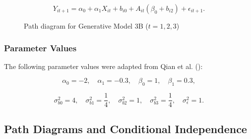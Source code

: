 \documentclass[
  12pt,
  a4paper,
]{article}
\begin{document}
\[
Y_{it+1} = \alpha_0 + \alpha_1 X_{it} + b_{i0} + A_{it} (\beta_0 + b_{i2}) + \epsilon_{it+1}.
\]

\begin{figure}[H]

\caption{\label{fig-GM3B_path}Path diagram for Generative Model 3B
(\(t = 1, 2, 3\))}


\end{figure}%

\subsubsection{Parameter Values}\label{parameter-values}

The following parameter values were adapted from Qian et al.
():

\[
\alpha_0 = -2, \quad \alpha_1 = -0.3, \quad \beta_0 = 1, \quad \beta_1 = 0.3,
\]

\[
\sigma_{b0}^2 = 4, \quad \sigma_{b1}^2 = \frac{1}{4}, \quad \sigma_{b2}^2 = 1, \quad \sigma_{b3}^2 = \frac{1}{4}, \quad \sigma_\epsilon^2 = 1.
\]

\subsection{Path Diagrams and Conditional
Independence}\label{path-diagrams-and-conditional-independence}
\end{document}
